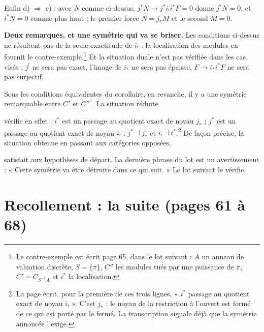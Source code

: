 \documentclass[11pt,a4paper]{article}
\begin{document}
Enfin d) $\Rightarrow$ c) : avec $N$ comme ci-dessus, $j^{*}N \to
j^{*}i_{!}i^{*}F = 0$ donne $j^{*}N = 0$, et $i^{*}N = 0$ comme plus haut ; le
premier force $N = j_{*}M$ et le second $M = 0$.


\textbf{Deux remarques, et une symétrie qui va se briser.} Les conditions
ci-dessus ne résultent pas de la seule exactitude de $i_{!}$ : la localisation
des modules en fournit le contre-exemple.\footnote{Le contre-exemple est écrit
page 65, dans le lot suivant : $A$ un anneau de valuation discrète, $S =
\{\pi\}$, $C''$ les modules tués par une puissance de $\pi$, $C' = C_{S^{-1}A}$
et $i^{*}$ la localisation.} Et la situation duale n'est pas vérifiée dans les
cas visés : $j^{!}$ ne sera pas exact, l'image de $i_{*}$ ne sera pas épaisse,
$F \to i_{*}i^{*}F$ ne sera pas surjectif.

Sous les conditions équivalentes du corollaire, en revanche, il y a une
symétrie remarquable entre $C'$ et $C''^{\circ}$. La situation réduite


vérifie en effet : $i^{*}$ est un passage au quotient exact de noyau $j_{*}$ ;
$j^{*}$ est un passage au quotient exact de noyau $i_{!}$ ; $j^{*} \dashv
j_{*}$ et $i_{!} \dashv i^{*}$.\footnote{La page écrit, pour la première de ces
trois lignes, « $i^{*}$ passage au quotient exact de noyau $i_{!}$ ». C'est
$j_{*}$ : le noyau de la restriction à l'ouvert est formé de ce qui est porté
par le fermé. La transcription signale déjà que la symétrie annoncée l'exige.}
De façon précise, la situation obtenue en passant aux catégories opposées,


satisfait aux hypothèses de départ. La dernière phrase du lot est un
avertissement : « Cette symétrie va être détruite dans ce qui suit. » Le lot
suivant le vérifie.

\section*{Recollement : la suite (pages 61 à 68)}
\end{document}
